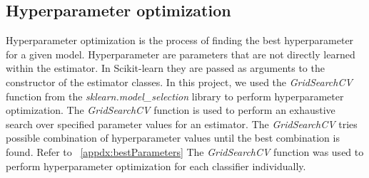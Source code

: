 \documentclass[conference,onecolumn]{IEEEtran}
\begin{document}
  

    \subsection{Hyperparameter optimization}
        Hyperparameter optimization is the process of finding the best hyperparameter for a given model. Hyperparameter are parameters that are not directly learned within the estimator\cite{bergstra2012random}. In Scikit-learn they are passed as arguments to the constructor of the estimator classes. In this project, we used the \emph{GridSearchCV} function from the \emph{sklearn.model\_selection} library to perform hyperparameter optimization. The \emph{GridSearchCV} function is used to perform an exhaustive search over specified parameter values for an estimator. The \emph{GridSearchCV} tries possible combination of hyperparameter values until the best combination is found. Refer to \appendixname~\ref{appdx:bestParameters} The \emph{GridSearchCV} function was used to perform hyperparameter optimization for each classifier individually.
        
\end{document}
